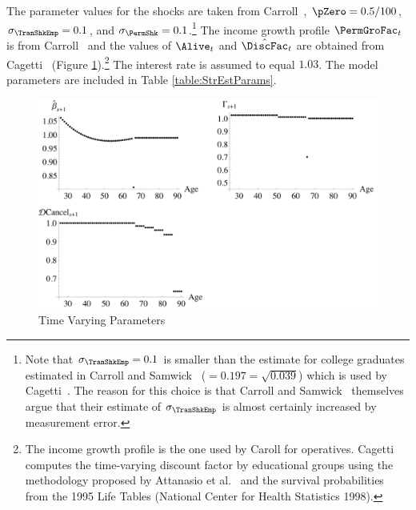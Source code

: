 \documentclass[titlepage, headings=optiontotocandhead]{\econtex}
\begin{document}
The parameter values for the shocks are taken from Carroll~\citeyearpar{carroll:brookings}, $\pZero=0.5/100$, $\sigma _{\TranShkEmp }=0.1$, and $\sigma_{\PermShk}=0.1$.\footnote{Note that $\sigma _{\TranShkEmp}=0.1$ is smaller than the estimate for college graduates estimated in
  Carroll and Samwick~\citeyearpar{carroll&samwick:nature} ($=0.197=\sqrt{0.039}$) which is used by Cagetti~\citeyearpar{cagettiWprofiles}. The reason for this choice is that Carroll and Samwick~\citeyearpar{carroll&samwick:nature} themselves argue that their estimate of $\sigma_{\TranShkEmp }$ is almost certainly increased by measurement error.} The income growth profile $\PermGroFac_{t}$ is from Carroll~\citeyearpar{carrollBSLCPIH} and the values of $\Alive_{t}$ and $\hat{\DiscFac}_{t}$ are obtained from Cagetti~\citeyearpar{cagettiWprofiles} (Figure \ref{fig:TimeVaryingParam}).\footnote{The income growth profile is the one used by Caroll for operatives. Cagetti computes the time-varying discount factor by educational groups using the methodology proposed by Attanasio et al.~\citeyearpar{AttanasioBanksMeghirWeber} and the survival probabilities from the 1995 Life Tables (National Center for Health Statistics 1998).} The interest rate is assumed to equal $1.03$. The model parameters are included in Table \ref{table:StrEstParams}.

\hypertarget{PlotTimeVaryingParam}{}
\begin{figure}[h]
  \includegraphics[width=6in]{./Figures/PlotTimeVaryingParam}
  \caption{Time Varying Parameters}
  \label{fig:TimeVaryingParam}
\end{figure}
\end{document}
